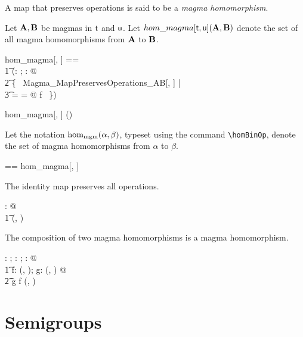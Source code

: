 \documentclass{amsart}
\begin{document}
A map that preserves operations is said to be a \textit{magma homomorphism}.

Let $\mathbf{A}, \mathbf{B}$ be magmas in $\mathsf{t}$ and $\mathsf{u}$. 
Let $hom\_magma[\mathsf{t}, \mathsf{u}](\mathbf{A}, \mathbf{B})$ denote the set of all magma homomorphisms from $\mathbf{A}$ to $\mathbf{B}$.

\begin{zed}
	hom\_magma[\genT, \genU] == \\
	\t1	(\lambda \alpha: \magma \genT; \beta: \magma \genU @ \\
	\t2		\{~ Magma\_MapPreservesOperations\_AB[\genT, \genU] | \\
	\t3			\alpha = \strucA \land \beta = \strucB @ f ~\})
\end{zed}

\begin{remark}
\begin{zed}
	hom\_magma[\setT, \setU] \in \magma \setT \cross \magma \setU \fun \power (\setT \pfun \setU)
\end{zed}
\end{remark}

Let the notation $\operatorname{hom_{mgm}}(\alpha, \beta)$,  typeset using the command \verb|\homBinOp|, 
denote the set of magma homomorphisms from $\alpha$ to $\beta$.

\begin{zed}
	\homMagma[\genT, \genU] == hom\_magma[\genT, \genU]
\end{zed}

\begin{remark}
The identity map preserves all operations.
\begin{zed}
	\forall \strucA: \magma \setX @ \\
	\t1	\id \setX \in \homMagma(\strucA, \strucA)
\end{zed}
\end{remark}

\begin{remark}
The composition of two magma homomorphisms is a magma homomorphism.
\begin{zed}
	\forall \strucA: \magma \setX; \strucB: \magma \setY; \strucC: \magma \setZ @ \\
	\t1	\forall f: \homMagma(\strucA, \strucB); g: \homMagma(\strucB, \strucC) @ \\
	\t2		g \circ f \in \homMagma(\strucA, \strucC)
\end{zed}
\end{remark}

\section{Semigroups}
\end{document}
